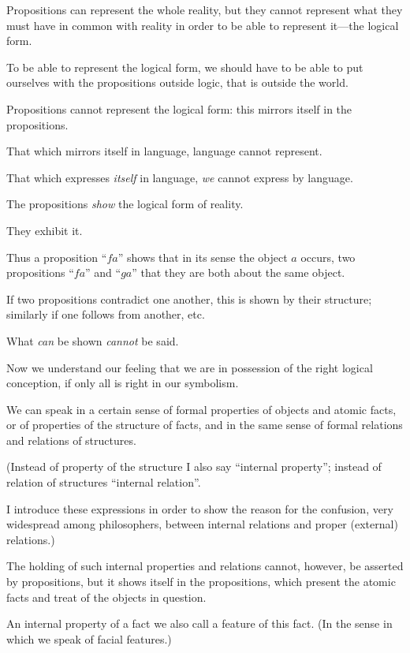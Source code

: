 {Propositions can represent the whole reality,
but they cannot represent what they must have in
common with reality in order to be able to represent
it---the logical form.

To be able to represent the logical form, we
should have to be able to put ourselves with the
propositions outside logic, that is outside the
world.}


{Propositions cannot represent the logical form:
this mirrors itself in the propositions.

That which mirrors itself in language, language
cannot represent.

That which expresses \emph{itself} in language, \emph{we}
cannot express by language.

The propositions \emph{show} the logical form of reality.

They exhibit it.}


{Thus a proposition ``$fa$'' shows that in its sense
the object $a$ occurs, two propositions ``$fa$'' and
``$ga$'' that they are both about the same object.

If two propositions contradict one another, this
is shown by their structure; similarly if one follows
from another, etc.}


{What \emph{can} be shown \emph{cannot} be said.}


{Now we understand our feeling that we are in
possession of the right logical conception, if only
all is right in our symbolism.}


{We can speak in a certain sense of formal
properties of objects and atomic facts, or of properties
of the structure of facts, and in the same
sense of formal relations and relations of
structures.

(Instead of property of the structure I also say
``internal property''; instead of relation of structures
``internal relation''.

I introduce these expressions in order to show
the reason for the confusion, very widespread
among philosophers, between internal relations
and proper (external) relations.)

The holding of such internal properties and relations
cannot, however, be asserted by propositions,
but it shows itself in the propositions, which
present the atomic facts and treat of the objects in
question.}


{An internal property of a fact we also call a
feature of this fact. (In the sense in which we
speak of facial features.)}


